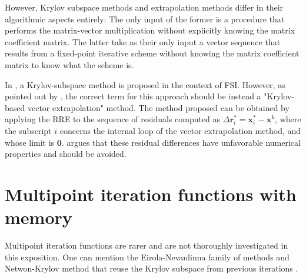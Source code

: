 However, Krylov subspace methods and extrapolation methods differ in their algorithmic aspects entirely:
The only input of the former is a procedure that performs the matrix-vector multiplication without explicitly knowing the matrix coefficient matrix.
The latter take as their only input a vector sequence that results from a fixed-point iterative scheme without knowing the matrix coefficient matrix to know what the scheme is.


In \cite{michler_interface_2005}, a Krylov-subspace method is proposed in the context of FSI.
However, as pointed out by \cite{kuttler_vector_2009}, the correct term for this approach should be instead a "Krylov-based vector extrapolation" method.
The method proposed can be obtained by applying the RRE to the sequence of residuals computed as
\(\Delta \mathbf r^*_i = \mathbf x^*_i - \mathbf x^k\), where the subscript \(i\) concerns the internal loop of the vector extrapolation method, and whose limit is \(\mathbf 0\).
\cite{kuttler_vector_2009} argues that these residual differences have unfavorable numerical properties and should be avoided.



\section{Multipoint iteration functions with memory}

Multipoint iteration functions are rarer and are not thoroughly investigated in this exposition.
One can mention the Eirola-Nevanlinna family of methods \citep{fang_two_2009} and Netwon-Krylov method that reuse the Krylov subspace from previous iterations \citep{sidi_vector_2017}.


